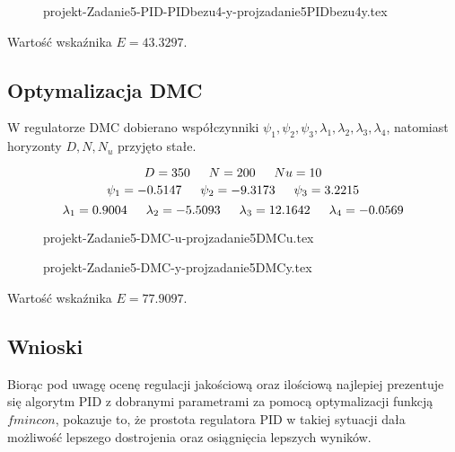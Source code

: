 \ifdefined\CompileFigures
\begin{figure}[H] 
    \centering
    
    \caption{projekt-Zadanie5-PID-PIDbezu4-y-projzadanie5PIDbezu4y.tex}
    \label{projekt:zad5:figure:projzadanie5PIDbezu4y}
\end{figure}
\fi

Wartość wskaźnika $E=\num{43.3297}$.

\subsection{Optymalizacja DMC}

W regulatorze DMC dobierano współczynniki $\psi_1, \psi_2, \psi_3, \lambda_1, \lambda_2, 
\lambda_3, \lambda_4$, 
natomiast horyzonty $D, N, N_u$ przyjęto stałe.


$$D=350 \indent  N=200 \indent  Nu=10$$ 
$$\psi_1=\num{-0.5147} \indent \psi_2=\num{-9.3173} \indent \psi_3=\num{3.2215 }$$
$$\lambda_1=\num{0.9004} \indent \lambda_2=\num{-5.5093} \indent \lambda_3=\num{12.1642} \indent \lambda_4=\num{-0.0569}$$



\ifdefined\CompileFigures
\begin{figure}[H] 
    \centering
    
    \caption{projekt-Zadanie5-DMC-u-projzadanie5DMCu.tex}
    \label{projekt:zad5:figure:projzadanie5DMCu}
\end{figure}
\fi

\ifdefined\CompileFigures
\begin{figure}[H] 
    \centering
    
    \caption{projekt-Zadanie5-DMC-y-projzadanie5DMCy.tex}
    \label{projekt:zad5:figure:projzadanie5DMCy}
\end{figure}
\fi

Wartość wskaźnika $E=\num{77.9097}$.

\subsection{Wnioski}

Biorąc pod uwagę ocenę regulacji jakościową oraz ilościową najlepiej prezentuje się
algorytm PID z dobranymi parametrami za pomocą optymalizacji funkcją $fmincon$,
pokazuje to, że prostota regulatora PID w takiej sytuacji dała możliwość lepszego
dostrojenia oraz osiągnięcia lepszych wyników.

